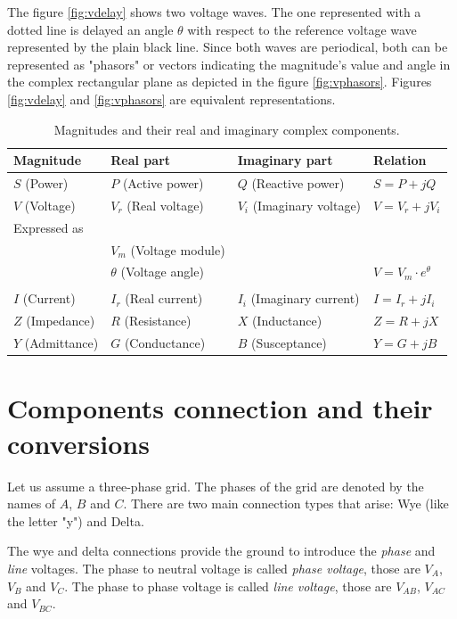 \documentclass[nols,a4paper,twoside,symmetric,notoc,fleqn]{tufte-book}
\begin{document}
The figure \ref{fig:vdelay} shows two voltage waves. The one represented with a dotted line is delayed an angle $\theta$ with respect to the reference voltage wave represented by the plain black line. Since both waves are periodical, both can be represented as "phasors" or vectors indicating the magnitude's value and angle in the complex rectangular plane as depicted in the figure \ref{fig:vphasors}. Figures \ref{fig:vdelay} and \ref{fig:vphasors} are equivalent representations.


\begin{table}[h]
\begin{center}
\footnotesize
\begin{tabular}{llll}
\toprule
Magnitude & Real part & Imaginary part & Relation\\
\midrule
$S$ (Power) & $P$ (Active power) & $Q$ (Reactive power) & $S=P +jQ$\\
$V$ (Voltage) & $V_r$ (Real voltage) & $V_i$ (Imaginary voltage) & $V=V_r +jV_i$\\
Expressed as  &  &  & \\
 & $V_m$ (Voltage module) &  & \\
 & $\theta$ (Voltage angle) &  & $V = V_m \cdot e^\theta$\\
  &  &  & \\
$I$ (Current) & $I_r$ (Real current) & $I_i$ (Imaginary current) & $I=I_r +jI_i$\\
$Z$ (Impedance) & $R$ (Resistance) & $X$ (Inductance) & $Z=R +jX$\\
$Y$ (Admittance) & $G$ (Conductance) & $B$ (Susceptance) & $Y=G +jB$\\
\bottomrule
\end{tabular}
\end{center}
  \caption{Magnitudes and their real and imaginary complex components.}
  \label{real_imaginary_table}
\end{table}






\section{Components connection and their conversions}

Let us assume a three-phase grid. The phases of the grid are denoted by the names of $A$, $B$ and $C$. There are two main connection types that arise: Wye (like the letter "y") and Delta.

The wye and delta connections provide the ground to introduce the \textit{phase} and \textit{line} voltages. The phase to neutral voltage is called \textit{phase voltage}, those are $V_A$, $V_B$ and $V_C$. The phase to phase voltage is called \textit{line voltage}, those are $V_{AB}$, $V_{AC}$ and $V_{BC}$.
\end{document}
